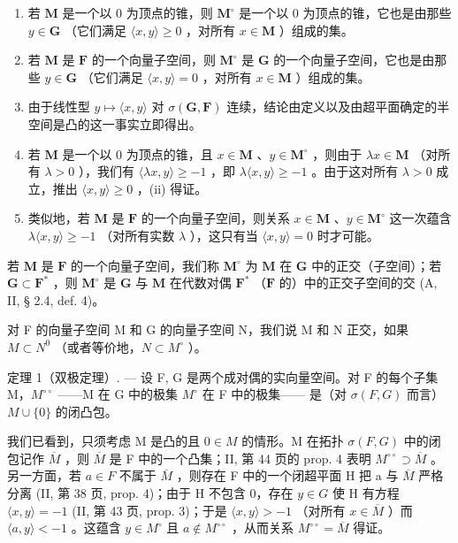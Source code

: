 \begin{enumerate}
\def\labelenumi{(\roman{enumi})}
\setcounter{enumi}{1}
\item
  若 \(\mathbf{M}\) 是一个以 0 为顶点的锥，则 \(\mathbf{M}^{\circ}\) 是一个以 0 为顶点的锥，它也是由那些 \(y\in \mathbf{G}\) （它们满足 \(\langle x,y\rangle \geqslant 0\) ，对所有 \(x\in \mathbf{M}\) ）组成的集。
\item
  若 \(\mathbf{M}\) 是 \(\mathbf{F}\) 的一个向量子空间，则 \(\mathbf{M}^{\circ}\) 是 \(\mathbf{G}\) 的一个向量子空间，它也是由那些 \(y \in \mathbf{G}\) （它们满足 \(\langle x, y \rangle = 0\) ，对所有 \(x \in \mathbf{M}\) ）组成的集。
\item
  由于线性型 \(y \mapsto \langle x, y \rangle\) 对 \(\sigma(\mathbf{G}, \mathbf{F})\) 连续，结论由定义以及由超平面确定的半空间是凸的这一事实立即得出。
\item
  若 \(\mathbf{M}\) 是一个以 0 为顶点的锥，且 \(x \in \mathbf{M}\) 、\(y \in \mathbf{M}^{\circ}\) ，则由于 \(\lambda x \in \mathbf{M}\) （对所有 \(\lambda > 0\) ），我们有 \(\langle \lambda x, y \rangle \geqslant -1\) ，即 \(\lambda \langle x, y \rangle \geqslant -1\) 。由于这对所有 \(\lambda > 0\) 成立，推出 \(\langle x, y \rangle \geqslant 0\) ，(ii) 得证。
\item
  类似地，若 \(\mathbf{M}\) 是 \(\mathbf{F}\) 的一个向量子空间，则关系 \(x \in \mathbf{M}\) 、\(y \in \mathbf{M}^{\circ}\) 这一次蕴含 \(\lambda \langle x, y \rangle \geqslant -1\) （对所有实数 \(\lambda\) ），这只有当 \(\langle x, y \rangle = 0\) 时才可能。
\end{enumerate}

若 \(\mathbf{M}\) 是 \(\mathbf{F}\) 的一个向量子空间，我们称 \(\mathbf{M}^{\circ}\) 为 \(\mathbf{M}\) 在 \(\mathbf{G}\) 中的正交（子空间）；若 \(\mathbf{G} \subset \mathbf{F}^{*}\) ，则 \(\mathbf{M}^{\circ}\) 是 \(\mathbf{G}\) 与 \(\mathbf{M}\) 在代数对偶 \(\mathbf{F}^{*}\) （\(\mathbf{F}\) 的）中的正交子空间的交 (A, II, § 2.4, def. 4)。

对 F 的向量子空间 M 和 G 的向量子空间 N，我们说 M 和 N 正交，如果 \(M \subset N^{0}\) （或者等价地，\(N \subset M^{\circ}\) ）。

定理 1（双极定理）. --- 设 F, G 是两个成对偶的实向量空间。对 F 的每个子集 M，\(M^{\circ\circ}\) ——M 在 G 中的极集 \(M^{\circ}\) 在 F 中的极集—— 是（对 \(\sigma(F, G)\) 而言）\(M \cup \{0\}\) 的闭凸包。

我们已看到，只须考虑 M 是凸的且 \(0 \in M\) 的情形。M 在拓扑 \(\sigma(F, G)\) 中的闭包记作 \(\overline{M}\) ，则 \(\overline{M}\) 是 F 中的一个凸集；II, 第 44 页的 prop. 4 表明 \(M^{\circ\circ} \supset \overline{M}\) 。另一方面，若 \(a \in F\) 不属于 \(\overline{M}\) ，则存在 F 中的一个闭超平面 H 把 a 与 \(\overline{M}\) 严格分离 (II, 第 38 页, prop. 4)；由于 H 不包含 0，存在 \(y \in G\) 使 H 有方程 \(\langle x, y \rangle = -1\) (II, 第 43 页, prop. 3)；于是 \(\langle x, y \rangle > -1\) （对所有 \(x \in \overline{M}\) ）而 \(\langle a, y \rangle < -1\) 。这蕴含 \(y \in M^{\circ}\) 且 \(a \notin M^{\circ\circ}\) ，从而关系 \(M^{\circ\circ} = \overline{M}\) 得证。

